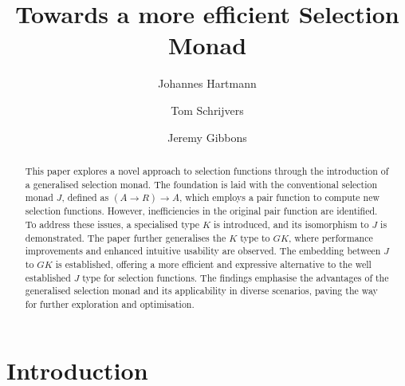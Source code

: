 \documentclass[runningheads]{llncs}
\newcommand{\ignore}[1]{}
\begin{document}
\title{Towards a more efficient Selection Monad}

\author{
    Johannes Hartmann \and 
    Tom Schrijvers\and 
    Jeremy Gibbons
}
%


%
\maketitle              %
%
\begin{abstract}
This paper explores a novel approach to selection functions through the
introduction of a generalised selection monad. The foundation is laid
with the conventional selection monad \(J\), defined as
\((A \rightarrow R) \rightarrow A\), which employs a pair function to
compute new selection functions. However, inefficiencies in the original
pair function are identified. To address these issues, a specialised
type \(K\) is introduced, and its isomorphism to \(J\) is demonstrated.
The paper further generalises the \(K\) type to \(GK\), where
performance improvements and enhanced intuitive usability are observed.
The embedding between \(J\) to \(GK\) is established, offering a more
efficient and expressive alternative to the well established \(J\) type
for selection functions. The findings emphasise the advantages of the
generalised selection monad and its applicability in diverse scenarios,
paving the way for further exploration and optimisation.

\end{abstract}
%
%
%
\ignore{

> {-# LANGUAGE ImpredicativeTypes #-}
> {-# LANGUAGE ScopedTypeVariables #-}

> import Prelude hiding ((>>=), return, pure, (<*>), fmap, sequence, pred)
> import Data.Function (on)
> import Data.List
> import Debug.Trace
  import GHC.Exts (the)
  
}

\section{Introduction}\label{introduction}
\end{document}
